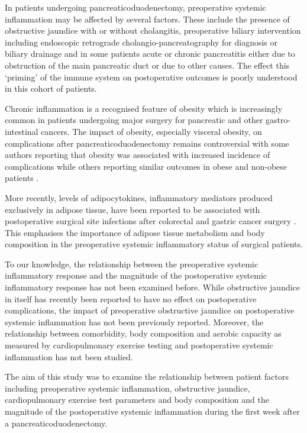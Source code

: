In patients undergoing pancreaticoduodenectomy, preoperative systemic inflammation may be affected by several factors. 
These include the presence of obstructive jaundice with or without cholangitis, preoperative biliary intervention including endoscopic retrograde cholangio-pancreatography for diagnosis or biliary drainage and in some patients acute or chronic pancreatitis either due to obstruction of the main pancreatic duct or due to other causes. 
The effect this `priming' of the immune system on postoperative outcomes is poorly understood in this cohort of patients. 

Chronic inflammation is a recognised feature of obesity which is increasingly common in patients undergoing major surgery for pancreatic and other gastro-intestinal cancers. 
The impact of obesity, especially visceral obesity, on complications after pancreaticoduodenectomy remains controversial with some authors reporting that obesity was associated with increased incidence of complications \parencite{house_preoperative_2008, ramsey_body_2011} while others reporting similar outcomes in obese and non-obese patients \parencite{khan_does_2010, tsai_impact_2010, balentine_obesity_2011}. 

More recently, levels of adipocytokines, inflammatory mediators produced exclusively in adipose tissue, have been reported to be associated with postoperative surgical site infections after colorectal \parencite{ortega-deballon_preoperative_2013, matsuda_preoperative_2009} and gastric cancer surgery \parencite{yamamoto_association_2013}.
This emphasises the importance of adipose tissue metabolism and body composition in the preoperative systemic inflammatory status of surgical patients. 

To our knowledge, the relationship between the preoperative systemic inflammatory response and the magnitude of the postoperative systemic inflammatory response has not been examined before. 
While obstructive jaundice in itself has recently been reported to have no effect on postoperative complications, the impact of preoperative obstructive jaundice on postoperative systemic inflammation has not been previously reported. 
Moreover, the relationship between comorbidity, body composition and aerobic capacity as measured by cardiopulmonary exercise testing and postoperative systemic inflammation has not been studied. 

The aim of this study was to examine the relationship between patient factors including preoperative systemic inflammation, obstructive jaundice, cardiopulmonary exercise test parameters and body composition and the magnitude of the postoperative systemic inflammation during the first week after a pancreaticoduodenectomy. 

